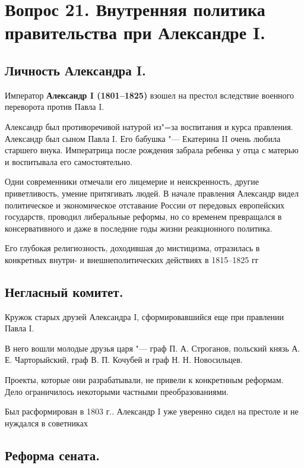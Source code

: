\section{Вопрос 21. Внутренняя политика правительства при Александре I.}

\subsection{Личность Александра I.}

Император \textbf{Александр I (1801--1825)} взошел на престол вследствие военного переворота против Павла I. 

Александр был противоречивой натурой из"=за воспитания и курса правления. Александр был сыном Павла I. Его бабушка "--- Екатерина II очень любила старшего внука. Императрица после рождения забрала ребенка у отца с матерью и воспитывала его самостоятельно.

Одни современники отмечали его лицемерие и неискренность, другие приветливость, умение притягивать людей.
В начале правления Александр видел политическое и экономическое отставание России от передовых европейских государств, проводил либеральные реформы, но со временем превращался в консервативного и даже в последние годы жизни реакционного политика. 

Его глубокая религиозность, доходившая до мистицизма, отразилась в конкретных внутри- и внешнеполитических действиях в 1815--1825 гг

\subsection{Негласный комитет.}

Кружок старых друзей Александра I, сформировавшийся еще при правлении Павла I.

В него вошли молодые друзья царя "--- граф П. А. Строганов, польский князь А. Е. Чарторыйский, граф В. П. Кочубей и граф Н. Н. Новосильцев.

Проекты, которые они разрабатывали, не привели к конкретнным реформам. Дело ограничилось некоторыми частными преобразованиями.

Был расформирован в 1803 г.. Александр I уже уверенно сидел на престоле и не нуждался в советниках

\subsection{Реформа сената.}

